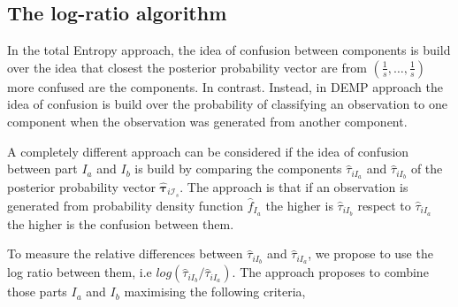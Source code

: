 \documentclass[10pt, a4paper]{article}
\newcommand{\m}[1]{\boldsymbol{#1}}
\begin{document}

\subsection*{The log-ratio algorithm}

In the total Entropy approach, the idea of confusion between components is build over the idea that closest the posterior probability vector are from $(\frac{1}{s}, \dots, \frac{1}{s})$ more confused are the components. In contrast. Instead, in DEMP approach the idea of confusion is build over the probability of classifying an observation to one component when the observation was generated from another component.

A completely different approach can be considered if the idea of confusion between part $I_a$ and $I_b$ is build by comparing the components $\hat{\tau}_{iI_a}$ and $\hat{\tau}_{iI_b}$ of the posterior probability vector $\hat{\m \tau}_{i \mathcal{I}_s}$. The approach is that if an observation is generated from probability density function $\hat{f}_{I_a}$ the higher is $\hat{\tau}_{iI_b}$ respect to $\hat{\tau}_{iI_a}$ the higher is the confusion between them. 

%
%


To measure the relative differences between  $\hat{\tau}_{iI_b}$ and $\hat{\tau}_{iI_a}$, we propose to use the log ratio between them, i.e $log( \hat{\tau}_{iI_b}/\hat{\tau}_{iI_a})$. The approach proposes to combine those parts $I_a$ and $I_b$ maximising the following criteria, 
\end{document}
